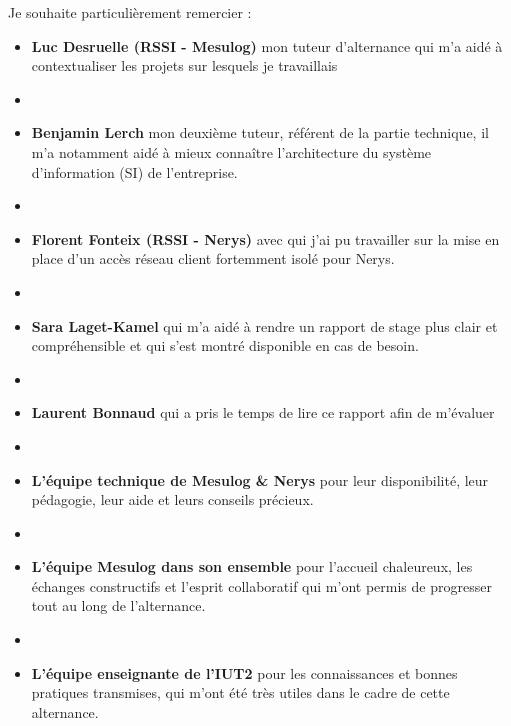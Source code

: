 \documentclass[a4paper, 11pt]{article}
\begin{document}
\par\vspace{\baselineskip} %

Je souhaite particulièrement remercier : 

\vspace{\baselineskip} %

\begin{itemize}
\item[$\bullet$] \textbf{Luc Desruelle (RSSI - Mesulog)} mon tuteur d'alternance qui m'a aidé à contextualiser les projets sur lesquels je travaillais
\item[] 

\item[$\bullet$] \textbf{Benjamin Lerch} mon deuxième tuteur, référent de la partie technique, il m'a notamment aidé à mieux connaître l'architecture du système d'information (SI) de l'entreprise.
\item[] 

\item[$\bullet$] \textbf{Florent Fonteix (RSSI - Nerys)} avec qui j'ai pu travailler sur la mise en place d'un accès réseau client fortemment isolé pour Nerys.
\item[] 


\item[$\bullet$] \textbf{Sara Laget-Kamel} qui m’a aidé à rendre un rapport de stage plus clair et compréhensible et qui s’est montré disponible en cas de besoin.
\item[] 

\item[$\bullet$] \textbf{Laurent Bonnaud} qui a pris le temps de lire ce rapport afin de m’évaluer
\item[] 


\item[$\bullet$] \textbf{L’équipe technique de Mesulog \& Nerys} pour leur disponibilité, leur pédagogie, leur aide et leurs conseils précieux.
\item[] 
\item[$\bullet$] \textbf{L’équipe Mesulog dans son ensemble} pour l’accueil chaleureux, les échanges constructifs et l’esprit collaboratif qui m’ont permis de progresser tout au long de l’alternance.
\item[] 
\item[$\bullet$] \textbf{L’équipe enseignante de l'IUT2} pour les connaissances et bonnes pratiques transmises, qui m’ont été très utiles dans le cadre de cette alternance.
\end{itemize}
\end{document}

